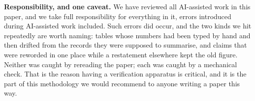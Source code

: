 \textbf{Responsibility, and one caveat.}  We have reviewed all AI-assisted work
in this paper, and we take full
responsibility for everything in it, errors introduced during
AI-assisted work included.  Such errors did occur, and the two kinds we hit
repeatedly are worth naming:
tables whose numbers had been typed by hand and then drifted from the records
they were supposed to summarise, and claims that were reworded in one place while
a restatement elsewhere kept the old figure.  Neither was caught by
rereading the paper; each was caught by a mechanical check.  That is the reason
having a verification apparatus is critical, and it is
the part of this methodology we would recommend to anyone writing a paper this
way.
